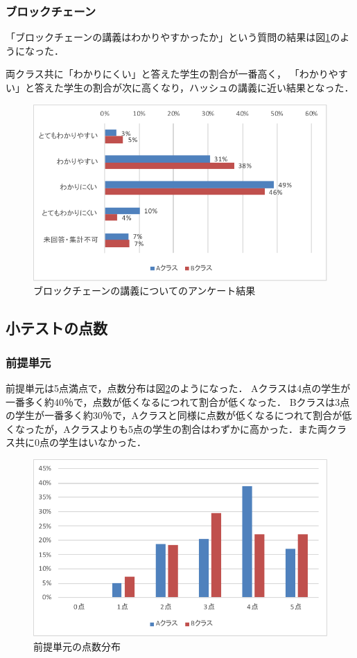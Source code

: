 \documentclass[a4j,12pt]{jsarticle}
\begin{document}
\newpage
\subsubsection{ブロックチェーン}

「ブロックチェーンの講義はわかりやすかったか」という質問の結果は図\ref{fig:blockank}のようになった．

両クラス共に「わかりにくい」と答えた学生の割合が一番高く，
「わかりやすい」と答えた学生の割合が次に高くなり，ハッシュの講義に近い結果となった．\\
\begin{figure}[H]
\centering
\includegraphics[width=12cm]{ankb1.pdf}
\caption{ブロックチェーンの講義についてのアンケート結果}
\label{fig:blockank}
\end{figure}





\newpage
\subsection{小テストの点数}
\subsubsection{前提単元}
前提単元は5点満点で，点数分布は図\ref{fig:zenten}のようになった．
Aクラスは4点の学生が一番多く約40％で，点数が低くなるにつれて割合が低くなった．
Bクラスは3点の学生が一番多く約30％で，Aクラスと同様に点数が低くなるにつれて割合が低くなったが，Aクラスよりも5点の学生の割合はわずかに高かった．また両クラス共に0点の学生はいなかった．

\begin{figure}[H]
\centering
\includegraphics[width=12cm]{12test.pdf}
\caption{前提単元の点数分布}
\label{fig:zenten}
\end{figure} 
\end{document}
